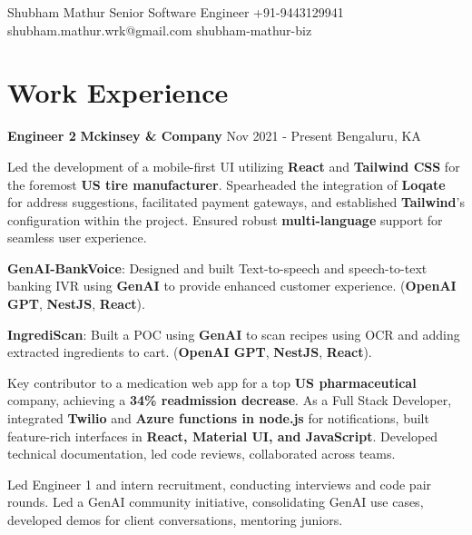 \documentclass[letterpaper]{resume_config}
\begin{document}
\Header
    {Shubham Mathur} %
    {Senior Software Engineer}
    {+91-9443129941} %
    {shubham.mathur.wrk@gmail.com} %
    {shubham-mathur-biz} %

\section{\textcolor{NavyBlue}{Work Experience}}

\WorkExperience
    {\textbf{Engineer 2}} %
    {\textbf{Mckinsey \& Company}} %
    {Nov 2021 - Present} %
    {Bengaluru, KA} %
    {
       \item{ Led the development of a mobile-first UI utilizing \textbf{React} and \textbf{Tailwind CSS} for the foremost \textbf{US tire manufacturer}. Spearheaded the integration of \textbf{Loqate} for address suggestions, facilitated payment gateways, and established \textbf{Tailwind}'s configuration within the project. Ensured robust \textbf{multi-language} support for seamless user experience.}
    \item{\textbf{GenAI-BankVoice}: Designed and built Text-to-speech and speech-to-text banking IVR using \textbf{GenAI} to provide enhanced customer experience. (\textbf{OpenAI GPT}, \textbf{NestJS}, \textbf{React}).}
    \item{\textbf{IngrediScan}: Built a POC using \textbf{GenAI} to scan recipes using OCR and adding extracted ingredients to cart. (\textbf{OpenAI GPT}, \textbf{NestJS}, \textbf{React}).}
    \item{Key contributor to a medication web app for a top \textbf{US pharmaceutical} company, achieving a \textbf{34\% readmission decrease}. As a Full Stack Developer, integrated \textbf{Twilio} and \textbf{Azure functions in node.js} for notifications, built feature-rich interfaces in \textbf{React, Material UI, and JavaScript}. Developed technical documentation, led code reviews, collaborated across teams.}
        \item Led Engineer 1 and intern recruitment, conducting interviews and code pair rounds. Led a GenAI community initiative, consolidating GenAI use cases, developed demos for client conversations, mentoring juniors.
    } 
\end{document}

